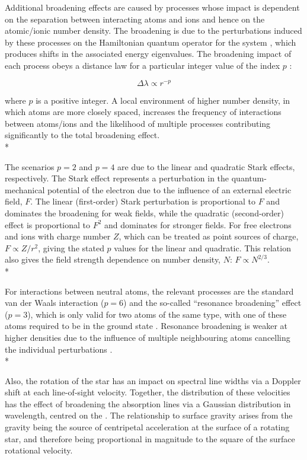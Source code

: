 \documentclass[12pt, a4paper]{report}
\begin{document}
Additional broadening effects are caused by processes whose impact is dependent on the separation between interacting atoms and ions and hence on the atomic/ionic number density. The broadening is due to the perturbations induced by these processes on the Hamiltonian quantum operator for the system \citep{1929ApJ....69..173S}, which produces shifts in the associated energy eigenvalues. The broadening impact of each process obeys a distance law for a particular integer value of the index $p$ \citep{Peach_1984}:

\begin{equation}
\Delta \lambda \propto r^{-p}
\label{broadening_dist}
\end{equation}

where $p$ is a positive integer. A local environment of higher number density, in which atoms are more closely spaced, increases the frequency of interactions between atoms/ions and the likelihood of multiple processes contributing significantly to the total broadening effect. \\*

The scenarios $p = 2$ and $p = 4$ are due to the linear and quadratic Stark effects, respectively. The Stark effect represents a perturbation in the quantum-mechanical potential of the electron due to the influence of an external electric field, $F$. The linear (first-order) Stark perturbation is proportional to $F$ and dominates the broadening for weak fields, while the quadratic (second-order) effect is proportional to $F^{2}$ and dominates for stronger fields. For free electrons and ions with charge number $Z$, which can be treated as point sources of charge, $F \propto Z/r^{2}$, giving the stated $p$ values for the linear and quadratic. This relation also gives the field strength dependence on number density, $N$: $F \propto N^{2/3}$.\\*

For interactions between neutral atoms, the relevant processes are the standard van der Waals interaction ($p = 6$) and the so-called ``resonance broadening'' effect ($p = 3$), which is only valid for two atoms of the same type, with one of these atoms required to be in the ground state \citep{1969A&A.....3..462L}. Resonance broadening is weaker at higher densities due to the influence of multiple neighbouring atoms cancelling the individual perturbations \citep{10.2307/96756}. \\*

Also, the rotation of the star has an impact on spectral line widths via a Doppler shift at each line-of-sight velocity. Together, the distribution of these velocities has the effect of broadening the absorption lines via a Gaussian distribution in wavelength, centred on the  \citep{1995ApJ...439..860C}. The relationship to surface gravity arises from the gravity being the source of centripetal acceleration at the surface of a rotating star, and therefore being proportional in magnitude to the square of the surface rotational velocity.
\end{document}
